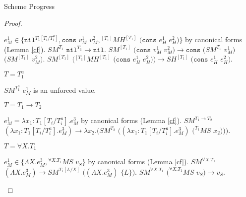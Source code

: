 \begin{theorem}{Scheme Progress}
\begin{proof}
\begin{case}{\pssm}
\begin{subcase}
$e_{M}^{1}\in\lbrace\mathtt{nil}^{T_{1}[T_{i}/T_{i}^{a}]},\mathtt{cons}$ $v_{M}^{1}$ $v_{M}^{2},{^{[T_{1}]}M}H^{[T_{1}]}$ $(\mathtt{cons}$ $e_{H}^{1}$ $e_{H}^{2})\rbrace$ by canonical forms (Lemma \ref{cf}).  $SM^{T_{1}}$ $\mathtt{nil}^{T_{1}}\rightarrow\mathtt{nil}$.  $SM^{[T_{1}]}$ $(\mathtt{cons}$ $v_{M}^{1}$ $v_{M}^{2})\rightarrow\mathtt{cons}$ $(SM^{T_{1}}$ $v_{M}^{1})$ $(SM^{[T_{1}]}$ $v_{M}^{2})$.  $SM^{[T_{1}]}$ $({^{[T_{1}]}M}H^{[T_{1}]}$ $(\mathtt{cons}$ $e_{H}^{1}$ $e_{H}^{2}))\rightarrow SH^{[T_{1}]}$ $(\mathtt{cons}$ $e_{H}^{1}$ $e_{H}^{2})$.

\end{subcase}

\begin{subcase}

$T=T_{1}^{a}$

$SM^{T_{1}^{a}}$ $e_{M}^{1}$ is an unforced value.

\end{subcase}

\begin{subcase}

$T=T_{1}\rightarrow T_{2}$

$e_{M}^{1}=\lambda x_{1}:T_{1}[T_{i}/T_{i}^{a}].e_{M}^{3}$ by canonical forms (Lemma \ref{cf}).  $SM^{T_{1}\rightarrow T_{2}}$ $(\lambda x_{1}:T_{1}[T_{i}/T_{i}^{a}].e_{M}^{3})\rightarrow\lambda x_{2}.(SM^{T_{2}}$ $((\lambda x_{1}:T_{1}[T_{i}/T_{i}^{a}].e_{M}^{3})$ $(^{T_{1}}MS$ $x_{2})))$.

\end{subcase}

\begin{subcase}

$T=\forall X.T_{1}$

$e_{M}^{1}\in\lbrace\Lambda X.e_{M}^{3},{^{\forall X.T_{1}}M}S$ $v_{S}\rbrace$ by canonical forms (Lemma \ref{cf}).  $SM^{\forall X.T_{1}}$ $(\Lambda X.e_{M}^{3})\rightarrow SM^{T_{1}[L/X]}$ $((\Lambda X.e_{M}^{3})$ $\lbrace L\rbrace)$.  $SM^{\forall X.T_{1}}$ $(^{\forall X.T_{1}}MS$ $v_{S})\rightarrow v_{S}$.

\end{subcase}

\end{case}

\end{proof}

\end{theorem}
